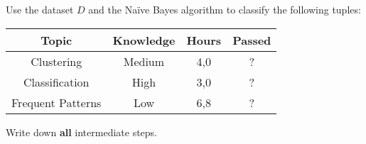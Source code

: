 \documentclass[
english,
smallborders
]{i6prcsht}
\begin{document}
Use the dataset $D$ and the Naïve Bayes algorithm to classify the following tuples:

\begin{center}
	\begin{tabular}{|c|c|c|c|}
		\hline
		\textbf{Topic}    & \textbf{Knowledge} & \textbf{Hours} & \textbf{Passed} \\ \hline
		Clustering        & Medium             & 4,0            & ?               \\ \hline
		Classification    & High               & 3,0            & ?               \\ \hline
		Frequent Patterns & Low                & 6,8            & ?               \\ \hline
	\end{tabular}
\end{center}

Write down \textbf{all} intermediate steps.
\end{document}
